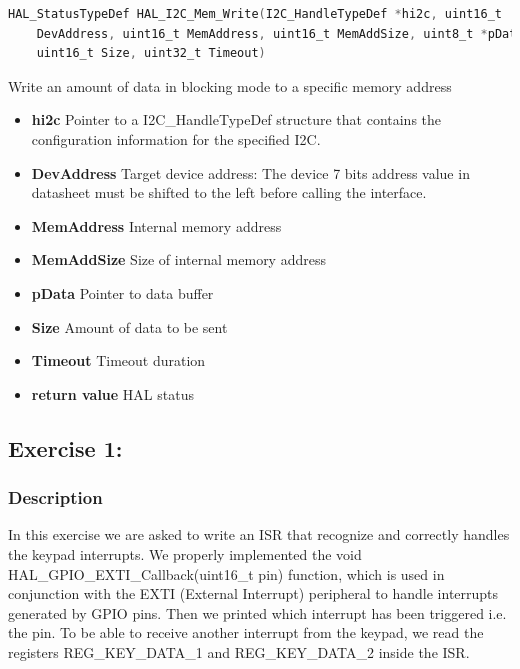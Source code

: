 \documentclass[english]{article}
\begin{document}
\begin{lstlisting}[language=C, caption={Writing Register values}, label={lst:write} ]
HAL_StatusTypeDef HAL_I2C_Mem_Write(I2C_HandleTypeDef *hi2c, uint16_t
    DevAddress, uint16_t MemAddress, uint16_t MemAddSize, uint8_t *pData,
    uint16_t Size, uint32_t Timeout)
\end{lstlisting}
Write an amount of data in blocking mode to a specific memory address
\begin{itemize}
    \item \textbf{hi2c} Pointer to a I2C\_HandleTypeDef structure that contains the configuration information
        for the specified I2C.
        \item \textbf{DevAddress} Target device address: The device 7 bits address value in datasheet must be
        shifted to the left before calling the interface.
        \item \textbf{MemAddress} Internal memory address
        \item \textbf{MemAddSize} Size of internal memory address
        \item \textbf{pData} Pointer to data buffer
        \item \textbf{Size} Amount of data to be sent
        \item \textbf{Timeout} Timeout duration 
        \item \textbf{return value} HAL status
\end{itemize}

\newpage
\subsection{Exercise 1:}
\subsubsection{Description}
In this exercise we are asked to write an ISR that recognize and correctly handles the keypad interrupts. We properly implemented the void HAL\_GPIO\_EXTI\_Callback(uint16\_t pin) function, which is used in conjunction with the EXTI (External Interrupt) peripheral to handle interrupts generated by GPIO pins. Then we printed which interrupt has
been triggered i.e. the pin. To be able to receive another interrupt from the keypad, we read
the registers REG\_KEY\_DATA\_1 and REG\_KEY\_DATA\_2 inside the ISR.
\end{document}

